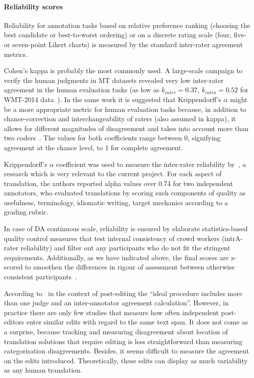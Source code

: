 \paragraph{Reliability scores} 
Reliability for annotation tasks based on relative preference ranking (choosing the best candidate or best-to-worst ordering) or on a discrete rating scale (four, five- or seven-point Likert charts) is measured by the standard inter-rater agreement metrics.
 
Cohen's kappa is probably the most commonly used. A large-scale campaign to verify the human judgments in MT datasets revealed very low inter-rater agreement in the human evaluation tasks (as low as $k_{inter} =0.37$, $k_{intra} =0.52$ for WMT-2014 data~\cite{Graham2015}). 
In the same work it is suggested that Krippendorff's $\alpha$ might be a more appropriate metric for human evaluation tasks because, in addition to chance-correction and interchangeability of raters (also assumed in kappa), it allows for different magnitudes of disagreement
and takes into account more than two coders~\cite{Artstein2008}. 
The values for both coefficients range between 0, signifying agreement at the chance level, to 1 for complete agreement.

Krippendorff's $\alpha$ coefficient was used to measure the inter-rater reliability by~\citet{Yuan2020}, a research which is very relevant to the current project. For each aspect of translation, the authors reported alpha values over 0.74 for two independent annotators, who evaluated translations by scoring such components of quality as usefulness, terminology, idiomatic writing, target mechanics according to a grading rubric.

In case of DA continuous scale, reliability is ensured by elaborate statistics-based quality control measures that test internal consistency of crowd workers (intrA-rater reliability) and filter out any participants who do not fit the stringent requirements. Additionally, as we have indicated above, the final scores are z-scored to smoothen the differences in rigour of assessment between otherwise consistent participants~\cite{Graham2013}. 

According to~\citet{Chatzikoumi2020} in the context of post-editing the ``ideal procedure includes more than one judge and an inter-annotator agreement calculation''. However, in practice there are only few studies that measure how often independent post-editors enter similar edits with regard to the same text span. 
It does not come as a surprise, because tracking and measuring disagreement about location of translation solutions that require editing is less straightforward than measuring categorisation disagreements. Besides, it seems difficult to measure the agreement on the edits introduced. Theoretically, these edits can display as much variability as any human translation. 

